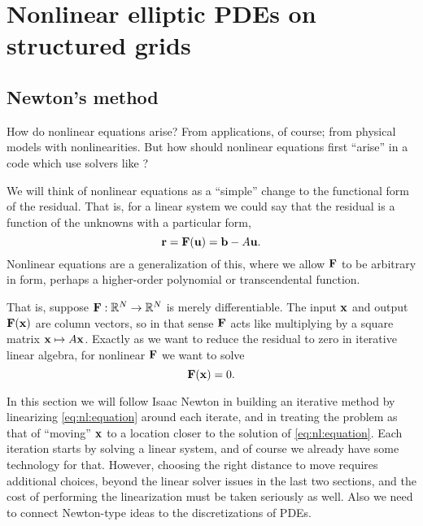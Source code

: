 \renewcommand{\CODELOC}{c/ch4/}

\chapter{Nonlinear elliptic PDEs on structured grids}
\label{chap:nonlinear}

\section{Newton's method}

How do nonlinear equations arise?  From applications, of course; from physical models with nonlinearities.  But how should nonlinear equations first ``arise'' in a code which use solvers like \PETSc?

We will think of nonlinear equations as a ``simple'' change to the functional form of the residual.  That is, for a linear system we could say that the residual is a function of the unknowns with a particular form,
\begin{equation}
\mathbf{r} = \mathbf{F}(\mathbf{u}) = \mathbf{b} - A \mathbf{u}. \label{eq:nl:linres}
\end{equation}
Nonlinear equations are a generalization of this, where we allow $\mathbf{F}$ to be arbitrary in form, perhaps a higher-order polynomial or transcendental function.

That is, suppose $\mathbf{F} : \mathbb{R}^N \to \mathbb{R}^N$ is merely differentiable.  The input $\mathbf{x}$ and output $\mathbf{F}(\mathbf{x})$ are column vectors, so in that sense $\mathbf{F}$ acts like multiplying by a square matrix $\mathbf{x}\mapsto A\mathbf{x}$.  Exactly as we want to reduce the residual to zero in iterative linear algebra, for nonlinear $\mathbf{F}$ we want to solve
\begin{equation}
   \mathbf{F}(\mathbf{x}) = 0.   \label{eq:nl:equation}
\end{equation}

In this section we will follow Isaac Newton in building an iterative method by linearizing \eqref{eq:nl:equation} around each iterate, and in treating the problem as that of ``moving'' $\mathbf{x}$ to a location closer to the solution of \eqref{eq:nl:equation}.  Each iteration starts by solving a linear system, and of course we already have some technology for that.  However, choosing the right distance to move requires additional choices, beyond the linear solver issues in the last two sections, and the cost of performing the linearization must be taken seriously as well.  Also we need to connect Newton-type ideas to the discretizations of PDEs.

